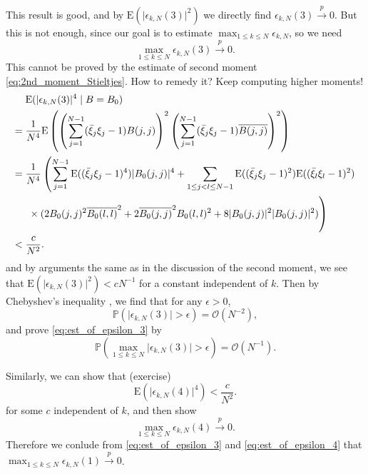 \documentclass[11pt, a4paper]{article}
\numberwithin{equation}{section}
\newcommand{\bigO}{\mathcal{O}}
\newcommand{\E}{\mathrm{E}}
\newcommand{\toprobab}{\stackrel{p}{\rightarrow}}
\newcommand{\Prob}{\mathbb{P}}
\theoremstyle{definition}
\theoremstyle{remark}
\begin{document}
This result is good, and by $\E(\lvert \epsilon_{k, N}(3) \rvert^2)$ we directly find $\epsilon_{k, N}(3) \toprobab 0$. But this is not enough, since our goal is to estimate $\max_{1 \leq k \leq N} \epsilon_{k, N}$, so we need
\begin{equation} \label{eq:est_of_epsilon_3}
  \max_{1 \leq k \leq N} \epsilon_{k, N}(3) \toprobab 0.
\end{equation}
This cannot be proved by the estimate of second moment \eqref{eq:2nd_moment_Stieltjes}. How to remedy it? Keep computing higher moments!
\begin{equation}
  \begin{split}
    & \E(\lvert \epsilon_{k, N}(3) \rvert^4 \mid B = B_0) \\
    = {}& \frac{1}{N^4} \E \left( \left( \sum^{N - 1}_{j = 1} (\bar{\xi}_j \xi_j - 1) B(j, j) \right)^2 \left( \sum^{N - 1}_{j = 1} (\bar{\xi}_j \xi_j - 1) \overline{B(j, j)} \right)^2 \right) \\
    = {}& \frac{1}{N^4} \left( \sum^{N - 1}_{j = 1} \E((\bar{\xi}_j \xi_j - 1)^4) \lvert B_0(j, j) \rvert^4 + \sum_{1 \leq j < l \leq N - 1} \E((\bar{\xi}_j \xi_j - 1)^2) \E((\bar{\xi}_l \xi_l - 1)^2) \right. \\
    & \left. \vphantom{\sum^{N - 1}_{j = 1} + \sum_{1 \leq j < l \leq N - 1}} \times (2 B_0(j, j)^2 \overline{B_0(l, l)}^2 + 2 \overline{B_0(j, j)}^2 B_0(l, l)^2 + 8 \lvert B_0(j, j) \rvert^2 \lvert B_0(j, j) \rvert^2) \right) \\
    < {}& \frac{c}{N^2}.
  \end{split}
\end{equation}
and by arguments the same as in the discussion of the second moment, we see that $\E(\lvert \epsilon_{k, N}(3) \rvert^2) < cN^{-1}$ for a constant independent of $k$. Then by Chebyshev's inequality \cite[Section 3.2]{Chung01}, we find that for any $\epsilon > 0$,
\begin{equation}
  \Prob(\lvert \epsilon_{k, N}(3) \rvert > \epsilon) = \bigO(N^{-2}),
\end{equation}
and prove \eqref{eq:est_of_epsilon_3} by
\begin{equation}
  \Prob(\max_{1 \leq k \leq N} \lvert \epsilon_{k, N}(3) \rvert > \epsilon) = \bigO(N^{-1}).
\end{equation}

Similarly, we can show that (exercise)
\begin{equation}
  \E(\lvert \epsilon_{k, N}(4) \rvert^4) < \frac{c}{N^2}.
\end{equation}
for some $c$ independent of $k$, and then show
\begin{equation} \label{eq:est_of_epsilon_4}
  \max_{1 \leq k \leq N} \epsilon_{k, N}(4) \toprobab 0.
\end{equation}
Therefore we conlude from \eqref{eq:est_of_epsilon_3} and \eqref{eq:est_of_epsilon_4} that $\max_{1 \leq k \leq N} \epsilon_{k, N}(1) \toprobab 0$.
\end{document}
